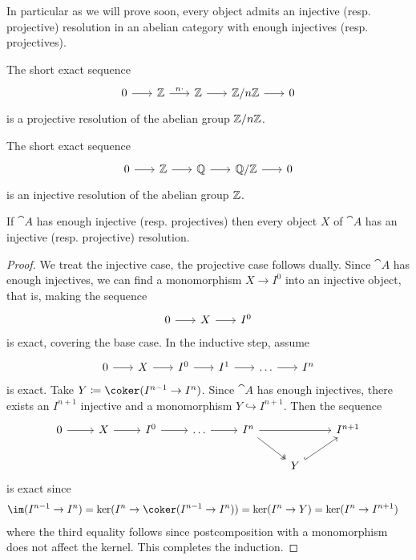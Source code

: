 \documentclass[../main.tex]{subfiles}
\begin{document}
In particular as we will prove soon, every object admits an injective (resp. projective) resolution in an abelian category with enough injectives (resp. projectives).

\begin{exmps}
The short exact sequence
    \[\begin{tikzcd}[column sep=scriptsize]
        0 \ar[r] & \bb Z \ar[r, "n\cdot"] & \bb Z \ar[r] & \bb Z/ n\bb Z \ar[r] & 0
    \end{tikzcd}\]
is a projective resolution of the abelian group \(\mathbb{Z}/n\mathbb{Z}\).

The short exact sequence
    \[\begin{tikzcd}[column sep=scriptsize]
        0\ar[r] & \bb Z \ar[r] & \bb Q \ar[r] & \bb Q / \bb Z \ar[r] & 0
    \end{tikzcd}\]
is an injective resolution of the abelian group \(\mathbb{Z}\).
\end{exmps}

\begin{lem}
    If $\cat A$ has enough injective (resp. projectives) then every object \(X\) of \(\cat A\) has an injective (resp. projective) resolution.
\end{lem}
\begin{proof}
    We treat the injective case, the projective case follows dually. Since $\cat A$ has enough injectives, we can find a monomorphism \(X\to I^0\) into an injective object, that is, making the sequence
    \[\begin{tikzcd}[column sep=scriptsize]
        0\ar[r] & X \ar[r] & I^0
    \end{tikzcd}\]
    is exact, covering the base case.
    In the inductive step, assume
    \[\begin{tikzcd}[column sep=scriptsize]
        0 \ar[r] & X \ar[r] & I^0 \ar[r] & I^1 \ar[r] & \dots \ar[r] & I^n
    \end{tikzcd}\]
    is exact. Take $Y \coloneq \coker(I^{n-1} \to I^n)$.
    Since $\cat A$ has enough injectives, there exists an $I^{n+1}$ injective and a monomorphism $Y\hookrightarrow I^{n+1}$. Then the sequence
\[\begin{tikzcd}
	0 & X & {I^0} & \dots & {I^n} && {I^{n+1}} \\
	&&&&& Y
	\arrow[from=1-1, to=1-2]
	\arrow[from=1-2, to=1-3]
	\arrow[from=1-3, to=1-4]
	\arrow[from=1-4, to=1-5]
	\arrow[from=1-5, to=1-7]
	\arrow[two heads, from=1-5, to=2-6]
	\arrow[hook, from=2-6, to=1-7]
\end{tikzcd}\]
is exact since
\begin{align*}
    \im(I^{n-1} \to I^n) &= \ker(I^n \to \coker(I^{n-1} \to I^n)) = \ker(I^n \to Y) = \ker(I^n \to I^{n+1})
\end{align*}
where the third equality follows since postcomposition with a monomorphism does not affect the kernel.
This completes the induction.
\end{proof}
\end{document}

